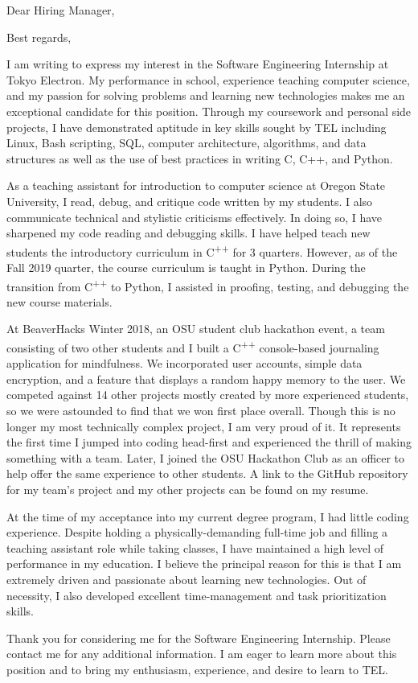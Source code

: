 \documentclass[11pt,a4paper,roman]{moderncv}        %
\begin{document}
\date{October 30, 2019}
\opening{Dear Hiring Manager,}
\closing{Best regards,}
\makelettertitle

I am writing to express my interest in the Software Engineering Internship at Tokyo Electron. My performance in school, experience teaching computer science, and my passion for solving problems and learning new technologies makes me an exceptional candidate for this position. Through my coursework and personal side projects, I have demonstrated aptitude in key skills sought by TEL including Linux, Bash scripting, SQL, computer architecture, algorithms, and data structures as well as the use of best practices in writing C, C++, and Python.
 
As a teaching assistant for introduction to computer science at Oregon State University, I read, debug, and critique code written by my students. I also communicate technical and stylistic criticisms effectively. In doing so, I have sharpened my code reading and debugging skills. I have helped teach new students the introductory curriculum in C\textsuperscript{++} for 3 quarters. However, as of the Fall 2019 quarter, the course curriculum is taught in Python. During the transition from C\textsuperscript{++} to Python, I assisted in proofing, testing, and debugging the new course materials.
 
At BeaverHacks Winter 2018, an OSU student club hackathon event, a team consisting of two other students and I built a C\textsuperscript{++} console-based journaling application for mindfulness. We incorporated user accounts, simple data encryption, and a feature that displays a random happy memory to the user. We competed against 14 other projects mostly created by more experienced students, so we were astounded to find that we won first place overall. Though this is no longer my most technically complex project, I am very proud of it. It represents the first time I jumped into coding head-first and experienced the thrill of making something with a team. Later, I joined the OSU Hackathon Club as an officer to help offer the same experience to other students. A link to the GitHub repository for my team's project and my other projects can be found on my resume.
 
At the time of my acceptance into my current degree program, I had little coding experience. Despite holding a physically-demanding full-time job and filling a teaching assistant role while taking classes, I have maintained a high level of performance in my education. I believe the principal reason for this is that I am extremely driven and passionate about learning new technologies. Out of necessity, I also developed excellent time-management and task prioritization skills.

Thank you for considering me for the Software Engineering Internship. Please contact me for any additional information. I am eager to learn more about this position and to bring my enthusiasm, experience, and desire to learn to TEL. 



\makeletterclosing
\end{document}
